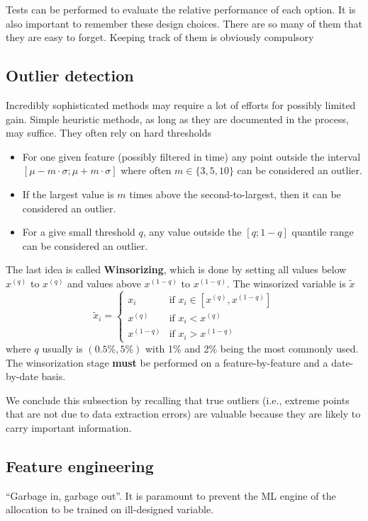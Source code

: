 Tests can be performed to evaluate the relative performance of each option. It is also important to remember these design choices. There are so many of them that they are easy to forget. Keeping track of them is obviously compulsory


\subsection{Outlier detection}
Incredibly sophisticated methods may require a lot of efforts for possibly limited gain. Simple heuristic methods, as long as they are documented in the process, may suffice. They often rely on hard thresholds
\begin{itemize}
    \item For one given feature (possibly filtered in time) any point outside the interval $[\mu - m \cdot \sigma; \mu + m \cdot \sigma]$ where often $m \in \{ 3,5,10 \} $ can be considered an outlier. 
    \item If the largest value is $m$ times above the second-to-largest, then it can be considered an outlier.
    \item For a give small threshold $q$, any value outside the $[q; 1-q]$ quantile range can be considered an outlier. 
\end{itemize}

The last idea is called \textbf{Winsorizing}, which is done by setting all values below $x^{(q)}$ to $x^{(q)}$ and values above $x^{(1-q)}$ to $x^{(1-q)}$. The winsorized variable is $\tilde{x}$
\[
    \tilde{x}_i = \begin{cases}
    x_{i} & \text{if } x_{i} \in [x^{(q)}, x^{(1-q)}] \\
    x^{(q)} & \text{if } x_{i} < x^{(q)} \\
    x^{(1-q)} & \text{if } x_{i} > x^{(1-q)} 
    \end{cases}
\]
where $q$ usually is $(0.5\%, 5\%)$ with 1\% and 2\% being the most commonly used. The winsorization stage \textbf{must} be performed on a feature-by-feature and a date-by-date basis.

We conclude this subsection by recalling that true outliers (i.e., extreme points that are not due to data extraction errors) are valuable because they are likely to carry important information.

\subsection{Feature engineering}
“Garbage in, garbage out”. It is paramount to prevent the ML engine of the allocation to be trained on ill-designed variable.

